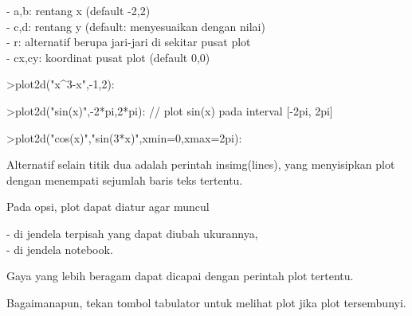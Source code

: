 \documentclass[a4paper,10pt]{article}
\begin{document}
\begin{eulernotebook}
\begin{eulercomment}
\begin{eulercomment}
\begin{eulercomment}
\begin{eulercomment}
\begin{eulercomment}
\begin{eulercomment}
\begin{eulercomment}
- a,b: rentang x (default -2,2)\\
- c,d: rentang y (default: menyesuaikan dengan nilai)\\
- r: alternatif berupa jari-jari di sekitar pusat plot\\
- cx,cy: koordinat pusat plot (default 0,0)
\end{eulercomment}
\begin{eulerprompt}
>plot2d("x^3-x",-1,2):
\end{eulerprompt}
\begin{eulerprompt}
>plot2d("sin(x)",-2*pi,2*pi): // plot sin(x) pada interval [-2pi, 2pi]
\end{eulerprompt}
\begin{eulerprompt}
>plot2d("cos(x)","sin(3*x)",xmin=0,xmax=2pi):
\end{eulerprompt}
\begin{eulercomment}
Alternatif selain titik dua adalah perintah insimg(lines), yang menyisipkan plot
dengan menempati sejumlah baris teks tertentu.

Pada opsi, plot dapat diatur agar muncul

- di jendela terpisah yang dapat diubah ukurannya,\\
- di jendela notebook.

Gaya yang lebih beragam dapat dicapai dengan perintah plot tertentu.

Bagaimanapun, tekan tombol tabulator untuk melihat plot jika plot tersembunyi.


\end{eulercomment}
\end{eulercomment}
\end{eulercomment}
\end{eulercomment}
\end{eulercomment}
\end{eulercomment}
\end{eulercomment}
\end{eulernotebook}
\end{document}
